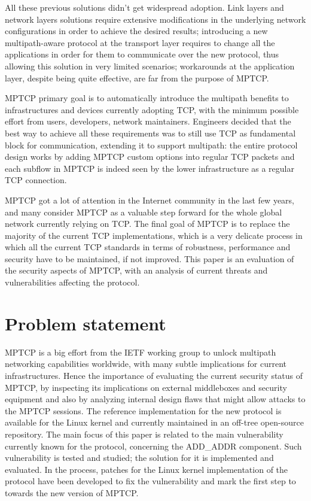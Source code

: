 All these previous solutions didn't get widespread adoption. Link layers and network layers solutions require extensive modifications in the underlying network configurations in order to achieve the desired results; introducing a new multipath-aware protocol at the transport layer requires to change all the applications in order for them to communicate over the new protocol, thus allowing this solution in very limited scenarios; workarounds at the application layer, despite being quite effective, are far from the purpose of MPTCP.


MPTCP primary goal is to automatically introduce the multipath benefits to infrastructures and devices currently adopting TCP, with the minimum possible effort from users, developers, network maintainers. Engineers decided that the best way to achieve all these requirements was to still use TCP as fundamental block for communication, extending it to support multipath: the entire protocol design works by adding MPTCP custom options into regular TCP packets and each subflow in MPTCP is indeed seen by the lower infrastructure as a regular TCP connection. 

MPTCP got a lot of attention in the Internet community in the last few years, and many consider MPTCP as a valuable step forward for the whole global network currently relying on TCP.
The final goal of MPTCP is to replace the majority of the current TCP implementations, which is a very delicate process in which all the current TCP standards in terms of robustness, performance and security have to be maintained, if not improved. This paper is an evaluation of the security aspects of MPTCP, with an analysis of current threats and vulnerabilities affecting the protocol.

\section{Problem statement}
MPTCP is a big effort from the IETF working group to unlock multipath networking capabilities worldwide, with many subtle implications for current infrastructures. Hence the importance of evaluating the current security status of MPTCP, by inspecting its implications on external middleboxes and security equipment and also by analyzing internal design flaws that might allow attacks to the MPTCP sessions. 
The reference implementation for the new protocol is available for the Linux kernel and currently maintained in an off-tree open-source repository.
The main focus of this paper is related to the main vulnerability currently known for the protocol, concerning the ADD\_ADDR component. Such vulnerability is tested and studied; the solution for it is implemented and evaluated. In the process, patches for the Linux kernel implementation of the protocol have been developed to fix the vulnerability and mark the first step to towards the new version of MPTCP. 


